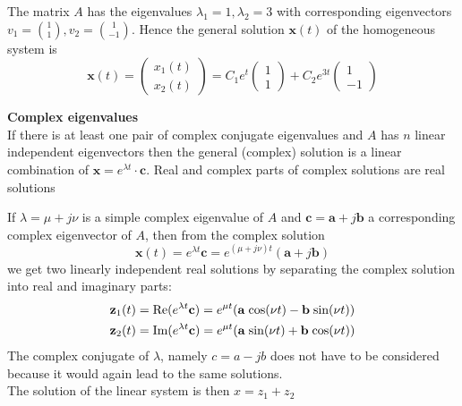 The matrix $A$ has the eigenvalues $\lambda_1 = 1, \lambda_2 = 3$ with corresponding eigenvectors $v_1 = \binom{1}{1}, v_2 = \binom{1}{-1}$. Hence the general solution $\mathbf{x}(t)$ of the homogeneous system is
\begin{equation}
  \mathbf{x}(t) = \begin{pmatrix}
    x_1(t)\\
    x_2(t)
  \end{pmatrix} = C_1 e^t \begin{pmatrix} 1 \\ 1 \end{pmatrix} +
  C_2 e^{3t} \begin{pmatrix} 1 \\ -1 \end{pmatrix}
\end{equation}

\textbf{Complex eigenvalues}\\
If there is at least one pair of complex conjugate eigenvalues and $A$ has $n$ linear independent eigenvectors then the general (complex) solution is a linear combination of $\mathbf{x} = e^{\lambda t}\cdot \mathbf{c}$. Real and complex parts of complex solutions are real
solutions


If $\lambda = \mu + j\nu$ is a simple complex eigenvalue of $A$ and $\mathbf{c} = \mathbf{a} + j\mathbf{b}$ a corresponding complex eigenvector of $A$, then from the complex solution
\begin{equation}
  \mathbf{x}(t) = e^{\lambda t} \mathbf{c} = e^{(\mu + j\nu)t} (\mathbf{a} + j\mathbf{b})
\end{equation}
we get two linearly independent real solutions by separating the complex solution into real and imaginary parts:
\begin{equation}
  \begin{split}
    \mathbf{z}_1(t) &= \textup{Re}(e^{\lambda t} \mathbf{c}) = e^{\mu t}(\mathbf{a} \; \textup{cos}(\nu t) - \mathbf{b} \; \textup{sin}(\nu t))\\
    \mathbf{z}_2(t) &= \textup{Im}(e^{\lambda t} \mathbf{c}) = e^{\mu t}(\mathbf{a} \; \textup{sin}(\nu t) + \mathbf{b} \; \textup{cos}(\nu t))
  \end{split}
\end{equation}
The complex conjugate of $\lambda$, namely $c = a - jb$ does not have to be considered because it would again lead to the same solutions.\\
The solution of the linear system is then $x = z_1 + z_2$\\

